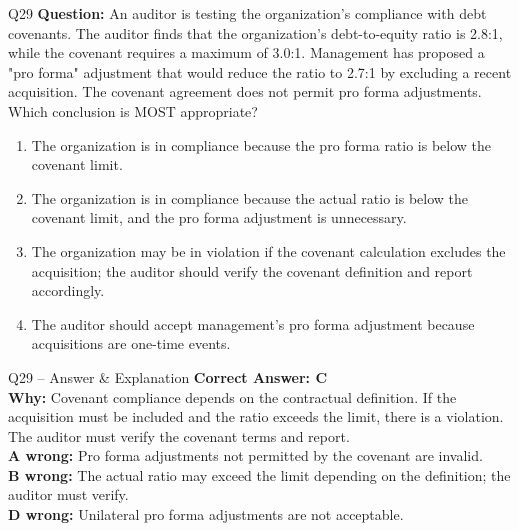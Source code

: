 \documentclass[aspectratio=169,10pt]{beamer}
\begin{document}
	\begin{frame}[t]{Q29}
		\small
		\textbf{Question:} An auditor is testing the organization's compliance with debt covenants. The auditor finds that the organization's debt-to-equity ratio is 2.8:1, while the covenant requires a maximum of 3.0:1. Management has proposed a "pro forma" adjustment that would reduce the ratio to 2.7:1 by excluding a recent acquisition. The covenant agreement does not permit pro forma adjustments. Which conclusion is MOST appropriate?
		\begin{enumerate}[label=\Alph*.,itemsep=1pt,topsep=2pt]
			\item The organization is in compliance because the pro forma ratio is below the covenant limit.
			\item The organization is in compliance because the actual ratio is below the covenant limit, and the pro forma adjustment is unnecessary.
			\item The organization may be in violation if the covenant calculation excludes the acquisition; the auditor should verify the covenant definition and report accordingly.
			\item The auditor should accept management's pro forma adjustment because acquisitions are one-time events.
		\end{enumerate}
	\end{frame}
	
	\begin{frame}[t]{Q29 -- Answer \& Explanation}
		\small
		\textbf{Correct Answer: C} \\[4pt]
		\textbf{Why:} Covenant compliance depends on the contractual definition. If the acquisition must be included and the ratio exceeds the limit, there is a violation. The auditor must verify the covenant terms and report. \\[4pt]
		\textbf{A wrong:} Pro forma adjustments not permitted by the covenant are invalid. \\[2pt]
		\textbf{B wrong:} The actual ratio may exceed the limit depending on the definition; the auditor must verify. \\[2pt]
		\textbf{D wrong:} Unilateral pro forma adjustments are not acceptable.
	\end{frame}
	
\end{document}
